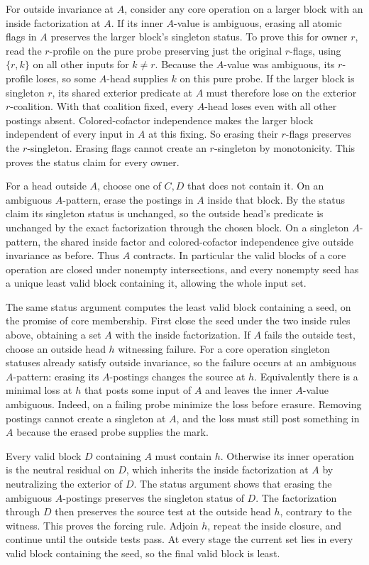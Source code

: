 For outside invariance at $A$, consider any core
operation on a larger block with an inside
factorization at $A$. If its inner $A$-value is
ambiguous, erasing all atomic flags in $A$ preserves
the larger block's singleton status. To prove this
for owner $r$, read the $r$-profile on the pure probe
preserving just the original $r$-flags, using
$\{r,k\}$ on all other inputs for $k\ne r$. Because
the $A$-value was ambiguous, its $r$-profile loses,
so some $A$-head supplies $k$ on this pure probe.
If the larger block is singleton $r$, its shared
exterior predicate at $A$ must therefore lose on
the exterior $r$-coalition. With that coalition
fixed, every $A$-head loses even with all other
postings absent. Colored-cofactor independence
makes the larger block independent of every input
in $A$ at this fixing. So erasing their $r$-flags
preserves the $r$-singleton. Erasing flags cannot
create an $r$-singleton by monotonicity. This proves
the status claim for every owner.

For a head outside $A$, choose one of $C,D$ that
does not contain it. On an ambiguous $A$-pattern,
erase the postings in $A$ inside that block. By the
status claim its singleton status is unchanged, so
the outside head's predicate is unchanged by the
exact factorization through the chosen block. On a
singleton $A$-pattern, the shared inside factor and
colored-cofactor independence give outside invariance
as before. Thus $A$ contracts. In particular the
valid blocks of a core operation are closed under
nonempty intersections, and every nonempty seed has
a unique least valid block containing it, allowing
the whole input set.

The same status argument computes the least valid block
containing a seed, on the promise of core membership.
First close the seed under the two inside rules above,
obtaining a set $A$ with the inside factorization.
If $A$ fails the outside test, choose an outside head
$h$ witnessing failure. For a core operation singleton
statuses already satisfy outside invariance, so the
failure occurs at an ambiguous $A$-pattern: erasing
its $A$-postings changes the source at $h$. Equivalently
there is a minimal loss at $h$ that posts some input
of $A$ and leaves the inner $A$-value ambiguous. Indeed,
on a failing probe minimize the loss before erasure.
Removing postings cannot create a singleton at $A$,
and the loss must still post something in $A$ because
the erased probe supplies the mark.

Every valid block $D$ containing $A$ must contain
$h$. Otherwise its inner operation is the neutral
residual on $D$, which inherits the inside factorization
at $A$ by neutralizing the exterior of $D$. The status
argument shows that erasing the ambiguous $A$-postings
preserves the singleton status of $D$. The factorization
through $D$ then preserves the source test at the
outside head $h$, contrary to the witness. This proves
the forcing rule. Adjoin $h$, repeat the inside closure,
and continue until the outside tests pass. At every
stage the current set lies in every valid block
containing the seed, so the final valid block is least.


